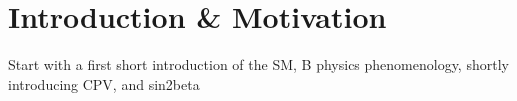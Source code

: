 
\chapter{Introduction \& Motivation}
Start with a first short introduction of the SM, B physics phenomenology, shortly introducing CPV, and sin2beta

